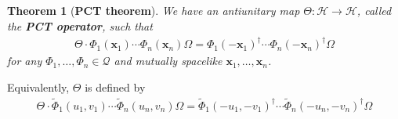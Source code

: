 \documentclass[12pt,b5paper,notitlepage]{article}
\theoremstyle{definition}
\theoremstyle{plain}
\newtheorem{thm}[df]{Theorem}
\newcommand{\mc}{\mathcal}
\newcommand{\wtd}{\widetilde}
\newcommand{\scr}{\mathscr}
\newcommand{\xbf}{\mathbf x}
\numberwithin{equation}{section}
\begin{document}
\subsection{}




\begin{thm}[\textbf{PCT theorem}]\label{lb10}
We have an antiunitary map $\Theta:\mc H\rightarrow\mc H$, called the \textbf{PCT operator},  such that
\begin{align}
\Theta\cdot \Phi_1(\xbf_1)\cdots\Phi_n(\xbf_n)\Omega=\Phi_1(-\xbf_1)^\dagger\cdots\Phi_n(-\xbf_n)^\dagger\Omega
\end{align}
for any $\Phi_1,\dots,\Phi_n\in\scr Q$ and mutually spacelike $\xbf_1,\dots,\xbf_n$.
\end{thm}


Equivalently, $\Theta$ is defined by
\begin{align}\label{eq13}
\Theta\cdot\wtd\Phi_1(u_1,v_1)\cdots\wtd\Phi_n(u_n,v_n)\Omega=\wtd\Phi_1(-u_1,-v_1)^\dagger\cdots \wtd\Phi_n(-u_n,-v_n)^\dagger\Omega
\end{align}
\end{document}
